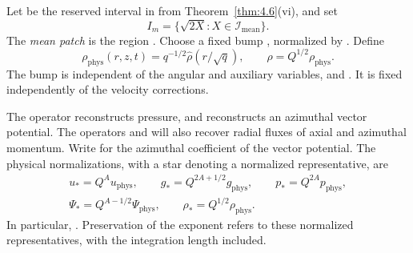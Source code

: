 Let  be the reserved interval in 
from Theorem~\ref{thm:4.6}(vi), and set
\[
I_m=\{\sqrt{2X}:X\in \mathcal I_{\mathrm{mean}}\}.
\]
The \emph{mean patch} is the region . Choose a fixed bump
, normalized by
. Define
\[
\rho_{\mathrm{phys}}(r,z,t)=q^{-1/2}\widehat\rho(r/\sqrt q),
\qquad \rho=Q^{1/2}\rho_{\mathrm{phys}}.
\]
The bump is independent of the angular and auxiliary variables, and
. It is fixed independently of
the velocity corrections.

The operator  reconstructs pressure, and
 reconstructs an azimuthal vector potential. The operators
 and  will also recover radial
fluxes of axial and azimuthal momentum. Write  for the azimuthal
coefficient of the vector potential. The physical normalizations, with a star denoting a normalized
representative, are
\begin{equation}
\begin{gathered}
u_*=Q^A u_{\mathrm{phys}},\qquad
g_*=Q^{2A+1/2}g_{\mathrm{phys}},\qquad
p_*=Q^{2A}p_{\mathrm{phys}},\\
\Psi_*=Q^{A-1/2}\Psi_{\mathrm{phys}},\qquad
\rho_*=Q^{1/2}\rho_{\mathrm{phys}}.
\end{gathered}
\tag{8.11}\label{eq:8.11}
\end{equation}
In particular,
.
Preservation of the  exponent refers to these normalized
representatives, with the integration length included.

